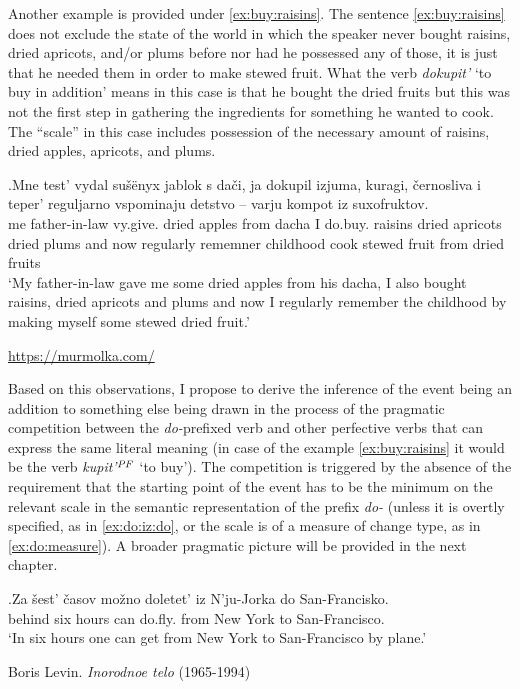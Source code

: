 Another example is provided under \ref{ex:buy:raisins}. The sentence \ref{ex:buy:raisins} does not exclude the state of the world in which the speaker never bought raisins, dried apricots, and/or plums before nor had he possessed any of those, it is just that he needed them in order to make stewed fruit. What the verb \textit{dokupit'} `to buy in addition' means in this case is that he bought the dried fruits but this was not the first step in gathering the ingredients for something he wanted to cook. The ``scale'' in this case includes possession of the necessary amount of raisins, dried apples, apricots, and plums. 

\exg.\label{ex:buy:raisins}Mne test' vydal su\v{s}\"{e}nyx jablok s da\v{c}i, ja dokupil izjuma, kuragi, \v{c}ernosliva i teper' reguljarno vspominaju detstvo -- varju kompot iz suxofruktov.\\
me father-in-law vy.give. dried apples from dacha I do.buy. raisins {dried apricots} {dried plums} and now regularly rememner childhood {} cook {stewed fruit} from {dried fruits}\\
\vspace{0.5em}
`My father-in-law gave me some dried apples from his dacha, I also bought raisins, dried apricots and plums and now I regularly remember the childhood by making myself some stewed dried fruit.'
\begin{flushright}
\vspace{-0.5em}
\url{https://murmolka.com/}
\end{flushright}

Based on this observations, I propose to derive the inference of the event being an addition to something else being drawn in the process of the pragmatic competition between the \textit{do-}prefixed verb and other perfective verbs that can express the same literal meaning (in case of the example \ref{ex:buy:raisins} it would be the verb \textit{kupit'$^{\mathit{PF}}$} `to buy'). The competition is triggered by the absence of the requirement that the starting point of the event has to be the minimum on the relevant scale in the semantic representation of the prefix \textit{do-} (unless it is overtly specified, as in \ref{ex:do:iz:do}, or the scale is of a measure of change type, as in \ref{ex:do:measure}). A broader pragmatic picture will be provided in the next chapter.

\exg.\label{ex:do:iz:do}Za \v{s}est' \v{c}asov mo\v{z}no doletet' iz N'ju-Jorka do San-Francisko.\\
behind six hours can do.fly. from {New York} to San-Francisco.\\
\vspace{0.5em}
`In six hours one can get from New York to San-Francisco by plane.'\\
\begin{flushright}
\vspace{-0.5em}
Boris Levin. \textit{Inorodnoe telo} (1965-1994)
\end{flushright}

